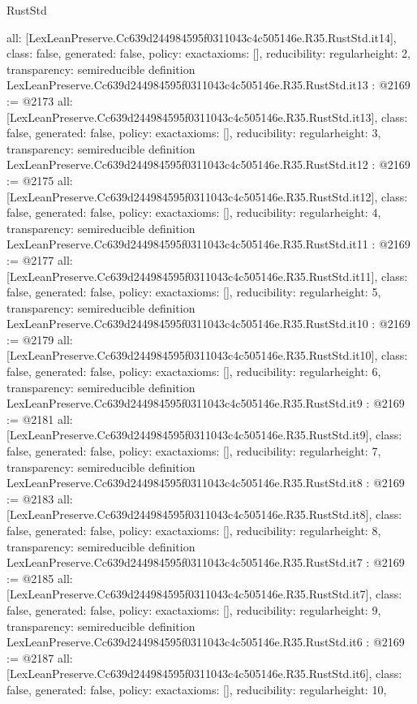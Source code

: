 \begin{lexlean}{RustStd}
\begin{coremodule}
{  all: [LexLeanPreserve.Cc639d244984595f0311043c4c505146e.R35.RustStd.it14],
  class: false,
  generated: false,
  policy: exact{axioms: []},
  reducibility: regular{height: 2},
  transparency: semireducible
}
definition LexLeanPreserve.Cc639d244984595f0311043c4c505146e.R35.RustStd.it13 : @2169 := @2173 {
  all: [LexLeanPreserve.Cc639d244984595f0311043c4c505146e.R35.RustStd.it13],
  class: false,
  generated: false,
  policy: exact{axioms: []},
  reducibility: regular{height: 3},
  transparency: semireducible
}
definition LexLeanPreserve.Cc639d244984595f0311043c4c505146e.R35.RustStd.it12 : @2169 := @2175 {
  all: [LexLeanPreserve.Cc639d244984595f0311043c4c505146e.R35.RustStd.it12],
  class: false,
  generated: false,
  policy: exact{axioms: []},
  reducibility: regular{height: 4},
  transparency: semireducible
}
definition LexLeanPreserve.Cc639d244984595f0311043c4c505146e.R35.RustStd.it11 : @2169 := @2177 {
  all: [LexLeanPreserve.Cc639d244984595f0311043c4c505146e.R35.RustStd.it11],
  class: false,
  generated: false,
  policy: exact{axioms: []},
  reducibility: regular{height: 5},
  transparency: semireducible
}
definition LexLeanPreserve.Cc639d244984595f0311043c4c505146e.R35.RustStd.it10 : @2169 := @2179 {
  all: [LexLeanPreserve.Cc639d244984595f0311043c4c505146e.R35.RustStd.it10],
  class: false,
  generated: false,
  policy: exact{axioms: []},
  reducibility: regular{height: 6},
  transparency: semireducible
}
definition LexLeanPreserve.Cc639d244984595f0311043c4c505146e.R35.RustStd.it9 : @2169 := @2181 {
  all: [LexLeanPreserve.Cc639d244984595f0311043c4c505146e.R35.RustStd.it9],
  class: false,
  generated: false,
  policy: exact{axioms: []},
  reducibility: regular{height: 7},
  transparency: semireducible
}
definition LexLeanPreserve.Cc639d244984595f0311043c4c505146e.R35.RustStd.it8 : @2169 := @2183 {
  all: [LexLeanPreserve.Cc639d244984595f0311043c4c505146e.R35.RustStd.it8],
  class: false,
  generated: false,
  policy: exact{axioms: []},
  reducibility: regular{height: 8},
  transparency: semireducible
}
definition LexLeanPreserve.Cc639d244984595f0311043c4c505146e.R35.RustStd.it7 : @2169 := @2185 {
  all: [LexLeanPreserve.Cc639d244984595f0311043c4c505146e.R35.RustStd.it7],
  class: false,
  generated: false,
  policy: exact{axioms: []},
  reducibility: regular{height: 9},
  transparency: semireducible
}
definition LexLeanPreserve.Cc639d244984595f0311043c4c505146e.R35.RustStd.it6 : @2169 := @2187 {
  all: [LexLeanPreserve.Cc639d244984595f0311043c4c505146e.R35.RustStd.it6],
  class: false,
  generated: false,
  policy: exact{axioms: []},
  reducibility: regular{height: 10},
}
\end{coremodule}
\end{lexlean}
